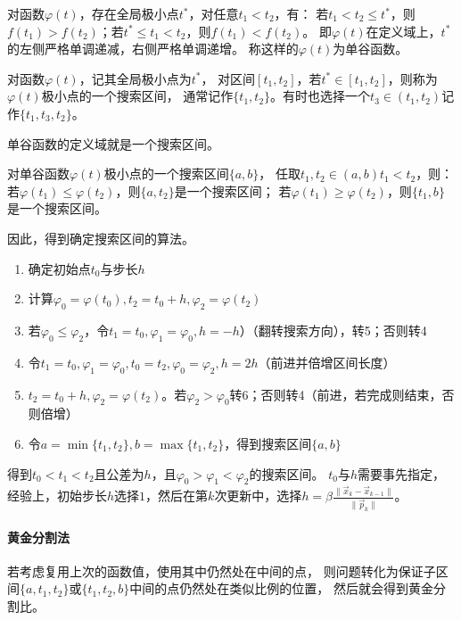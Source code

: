 \begin{definition}[单谷函数]
    对函数$\varphi(t)$，存在全局极小点$t^*$，对任意$t_1<t_2$，有：
    若$t_1<t_2\leq t^*$，则$f(t_1)>f(t_2)$；若$t^*\leq t_1<t_2$，则$f(t_1)<f(t_2)$。
    即$\varphi(t)$在定义域上，$t^*$的左侧严格单调递减，右侧严格单调递增。
    称这样的$\varphi(t)$为单谷函数。
\end{definition}

\begin{definition}[搜索区间]
    对函数$\varphi(t)$，记其全局极小点为$t^*$，
    对区间$[t_1,t_2]$，若$t^*\in [t_1,t_2]$，则称为$\varphi(t)$极小点的一个搜索区间，
    通常记作$\{t_1,t_2\}$。有时也选择一个$t_3\in (t_1,t_2)$记作$\{t_1,t_3,t_2\}$。
\end{definition}
单谷函数的定义域就是一个搜索区间。

\begin{theorem}
    对单谷函数$\varphi(t)$极小点的一个搜索区间$\{a,b\}$，
    任取$t_1,t_2\in (a,b) t_1<t_2$，则：
    若$\varphi(t_1)\leq \varphi(t_2)$，则$\{a,t_2\}$是一个搜索区间；
    若$\varphi(t_1)\geq \varphi(t_2)$，则$\{t_1,b\}$是一个搜索区间。
\end{theorem}

因此，得到确定搜索区间的算法。
\begin{enumerate} %
    \item 确定初始点$t_0$与步长$h$
    \item 计算$\varphi_0=\varphi(t_0),t_2=t_0+h,\varphi_2=\varphi(t_2)$
    \item 若$\varphi_0 \leq \varphi_2$，令$t_1=t_0,\varphi_1=\varphi_0,h=-h$）（翻转搜索方向），转5；否则转4
    \item 令$t_1=t_0,\varphi_1=\varphi_0,t_0=t_2,\varphi_0=\varphi_2,h=2h$（前进并倍增区间长度）
    \item $t_2=t_0+h,\varphi_2=\varphi(t_2)$。若$\varphi_2>\varphi_0$转6；否则转4（前进，若完成则结束，否则倍增）
    \item 令$a=\min\{t_1,t_2\},b=\max\{t_1,t_2\}$，得到搜索区间$\{a,b\}$
\end{enumerate}
得到$t_0<t_1<t_2$且公差为$h$，且$\varphi_0>\varphi_1<\varphi_2$的搜索区间。
$t_0$与$h$需要事先指定，
经验上，初始步长$h$选择$1$，然后在第$k$次更新中，选择$h=\beta\frac{\|\vec{x}_k - \vec{x}_{k-1}\|}{\|\vec{p}_k\|}$。

\paragraph{黄金分割法}
若考虑复用上次的函数值，使用其中仍然处在中间的点，
则问题转化为保证子区间$\{a,t_1,t_2\}$或$\{t_1,t_2,b\}$中间的点仍然处在类似比例的位置，
然后就会得到黄金分割比。

